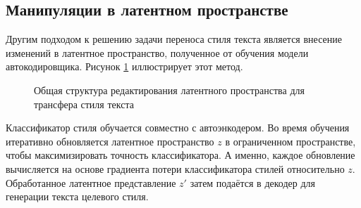 

\subsection{Манипуляции в латентном пространстве}
Другим подходом к решению задачи переноса стиля текста является внесение изменений в латентное пространство, полученное от обучения модели автокодировщика.
Рисунок \ref{fig:analysis_latent_repr_editing} иллюстрирует этот метод.
\begin{figure}[ht]
  \centering
  \caption{Общая структура редактирования латентного пространства для трансфера стиля текста}
  \label{fig:analysis_latent_repr_editing}
\end{figure}

Классификатор стиля обучается совместно с автоэнкодером.
Во время обучения итеративно обновляется латентное пространство $z$ в ограниченном пространстве, чтобы максимизировать точность классификатора.
А именно, каждое обновление вычисляется на основе градиента потери классификатора стилей относительно $z$.
Обработанное латентное представление $z'$ затем подаётся в декодер для генерации текста целевого стиля.

